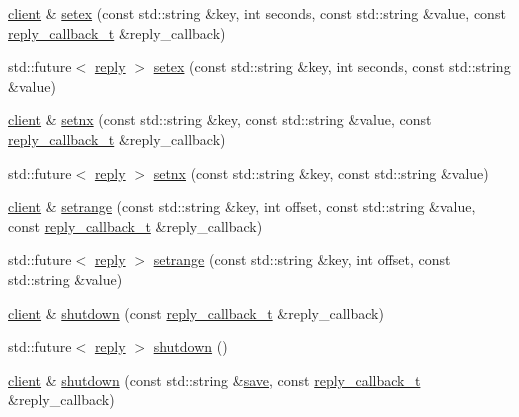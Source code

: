 \begin{DoxyCompactItemize}
\item 
\hyperlink{classcpp__redis_1_1client}{client} \& \hyperlink{classcpp__redis_1_1client_a9c82e27a54dc86febda83f34142ea402}{setex} (const std\+::string \&key, int seconds, const std\+::string \&value, const \hyperlink{classcpp__redis_1_1client_a061a1140d36d2eaeda82b09a0bb3f9f2}{reply\+\_\+callback\+\_\+t} \&reply\+\_\+callback)
\item 
std\+::future$<$ \hyperlink{classcpp__redis_1_1reply}{reply} $>$ \hyperlink{classcpp__redis_1_1client_a14f1f1c9f50437585a8e758d1a004a67}{setex} (const std\+::string \&key, int seconds, const std\+::string \&value)
\item 
\hyperlink{classcpp__redis_1_1client}{client} \& \hyperlink{classcpp__redis_1_1client_ad701f8b9e3769986b1af97049b52de83}{setnx} (const std\+::string \&key, const std\+::string \&value, const \hyperlink{classcpp__redis_1_1client_a061a1140d36d2eaeda82b09a0bb3f9f2}{reply\+\_\+callback\+\_\+t} \&reply\+\_\+callback)
\item 
std\+::future$<$ \hyperlink{classcpp__redis_1_1reply}{reply} $>$ \hyperlink{classcpp__redis_1_1client_a1ab0db92e48716812e4b30b268ce29ea}{setnx} (const std\+::string \&key, const std\+::string \&value)
\item 
\hyperlink{classcpp__redis_1_1client}{client} \& \hyperlink{classcpp__redis_1_1client_a3c1a2d69d9473de409f9102b61496f47}{setrange} (const std\+::string \&key, int offset, const std\+::string \&value, const \hyperlink{classcpp__redis_1_1client_a061a1140d36d2eaeda82b09a0bb3f9f2}{reply\+\_\+callback\+\_\+t} \&reply\+\_\+callback)
\item 
std\+::future$<$ \hyperlink{classcpp__redis_1_1reply}{reply} $>$ \hyperlink{classcpp__redis_1_1client_a628f79b8f8e424cdd4b70c076c21338a}{setrange} (const std\+::string \&key, int offset, const std\+::string \&value)
\item 
\hyperlink{classcpp__redis_1_1client}{client} \& \hyperlink{classcpp__redis_1_1client_acdb7064ddc309b1dbc6681ae559cc189}{shutdown} (const \hyperlink{classcpp__redis_1_1client_a061a1140d36d2eaeda82b09a0bb3f9f2}{reply\+\_\+callback\+\_\+t} \&reply\+\_\+callback)
\item 
std\+::future$<$ \hyperlink{classcpp__redis_1_1reply}{reply} $>$ \hyperlink{classcpp__redis_1_1client_ae457a1b446eff2e264452eb35de72d37}{shutdown} ()
\item 
\hyperlink{classcpp__redis_1_1client}{client} \& \hyperlink{classcpp__redis_1_1client_aca186e9b705a566203a47e8b29f99a28}{shutdown} (const std\+::string \&\hyperlink{classcpp__redis_1_1client_a01987f9fb419cfbce81872be8cd17619}{save}, const \hyperlink{classcpp__redis_1_1client_a061a1140d36d2eaeda82b09a0bb3f9f2}{reply\+\_\+callback\+\_\+t} \&reply\+\_\+callback)

\end{DoxyCompactItemize}
